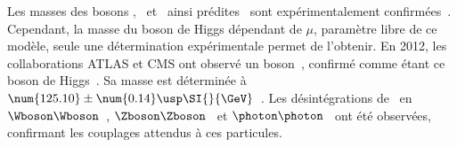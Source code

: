 \par Les masses des bosons \Wbosonpm, \photon\ et \Zboson\ ainsi prédites~\cite{Weinberg_leptons_model} sont expérimentalement confirmées~\cite{PDG_booklet_2020,Wboson_discovery1,Wboson_discovery2,Wboson_discovery3,Zboson_discovery1,Zboson_discovery2}.
Cependant, la masse du boson de Higgs dépendant de $\mu$, paramètre libre de ce modèle, seule une détermination expérimentale permet de l'obtenir. En 2012, les collaborations ATLAS et CMS ont observé un boson~\cite{ATLAS_Higgs_discovery,CMS_Higgs_discovery,CMS_Higgs_discovery_2013}, confirmé comme étant ce boson de Higgs~\cite{ATLAS-CMS-Higgs_combined_1,ATLAS-CMS-Higgs_combined_2}. Sa masse est déterminée à $\num{125.10}\pm\num{0.14}\usp\SI{}{\GeV}$~\cite{PDG_booklet_2020,2020135425,PhysRevD.99.112003}.
Les désintégrations de \higgs\ en
$\Wboson\Wboson$~\cite{higgs_WW},
$\Zboson\Zboson$~\cite{CMS-PAS-HIG-13-002,PhysRevD.89.092007}
et
$\photon\photon$~\cite{higgs_diphoton}
ont été observées, confirmant les couplages attendus à ces particules.
